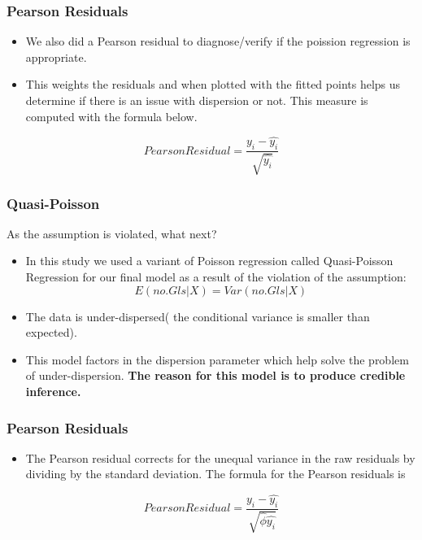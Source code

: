 \documentclass[11pt]{beamer}
\begin{document}
\begin{frame}
	\frametitle{Pearson Residuals}
 \begin{itemize}
 \setlength\itemsep{3em}
	\item We also did a Pearson residual to diagnose/verify if the poission regression is appropriate.
  \item This weights the residuals and when plotted with the fitted points helps us determine if there is an issue with dispersion or not. This measure is computed with the formula below.
 \end{itemize}
	\[Pearson Residual=\frac{y_i-\hat{y_i}}{\sqrt{\hat{y_i}}}\]  
\end{frame}
\begin{frame}
	\frametitle{Quasi-Poisson}
 As the assumption is violated, what next?
 \begin{itemize}
	\item In this study we used a variant of Poisson regression called Quasi-Poisson Regression for our final model as a result of the violation of the assumption: \[E(no.Gls|X) =Var(no.Gls|X)\]
    \item The data is under-dispersed( the conditional variance is smaller than expected).
	\item This model factors in the  dispersion parameter which help solve the problem of under-dispersion.\textbf{ The reason for this model is to produce credible inference.} 
 \end{itemize}
	
\end{frame}
\begin{frame}
	\frametitle{Pearson Residuals}
 \begin{itemize}
 \setlength\itemsep{3em}
	\item The Pearson residual corrects for the unequal variance in the raw residuals by dividing by the standard deviation. The formula for the Pearson residuals is
 \end{itemize}
	\[Pearson Residual=\frac{y_i-\hat{y_i}}{\sqrt{\hat{\phi}\hat{y_i}}}\]  
\end{frame}
\end{document}
